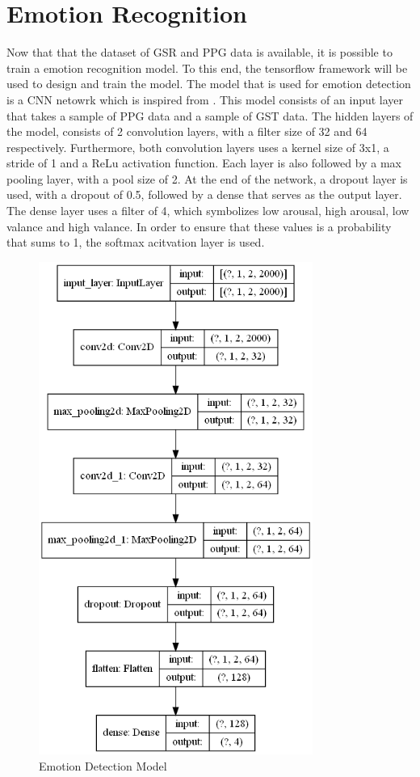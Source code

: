 \chapter{Emotion Recognition}
Now that that the dataset of GSR and PPG data is available, it is possible to train a emotion recognition model. To this end, the tensorflow framework will be used to design and train the model. The model that is used for emotion detection is a CNN netowrk which is inspired from \cite{CNNEmotionDetection}. This model consists of an input layer that takes a sample of PPG data and a sample of GST data. The hidden layers of the model, consists of 2 convolution layers, with a filter size of 32 and 64 respectively. Furthermore, both convolution layers uses a kernel size of 3x1, a stride of 1 and a ReLu activation function. Each layer is also followed by a max pooling layer, with a pool size of 2. At the end of the network, a dropout layer is used, with a dropout of 0.5, followed by a dense that serves as the output layer. The dense layer uses a filter of 4, which symbolizes low arousal, high arousal, low valance and high valance. In order to ensure that these values is a probability that sums to 1, the softmax acitvation layer is used.  





\begin{figure}[H]
    \centering
    \includegraphics[width=0.8\textwidth]{figures/Emotion_Detetion_Model.png}
    \caption{Emotion Detection Model}
    \label{fig:EmotionDetectionModel}
\end{figure}